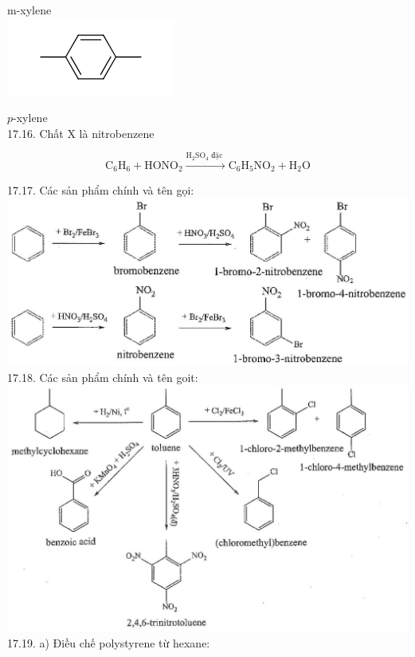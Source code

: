 \documentclass[10pt]{article}
\begin{document}
m-xylene\\
\includegraphics{smile-67610e9fb0b45057c2e3bce5b082eadec82d42d4}

$p$-xylene\\
17.16. Chất X là nitrobenzene

$$
\mathrm{C}_{6} \mathrm{H}_{6}+\mathrm{HONO}_{2} \xrightarrow{\mathrm{H}_{2} \mathrm{SO}_{4} \text { đặc }} \mathrm{C}_{6} \mathrm{H}_{5} \mathrm{NO}_{2}+\mathrm{H}_{2} \mathrm{O}
$$

17.17. Các sản phẩm chính và tên gọi:\\
\includegraphics[max width=\textwidth, center]{2025_10_23_ed7118e3280f74e91193g-27}\\
17.18. Các sản phẩm chính và tên goit:\\
\includegraphics[max width=\textwidth, center]{2025_10_23_ed7118e3280f74e91193g-28}\\
17.19. a) Điều chế polystyrene từ hexane:\\
\end{document}
